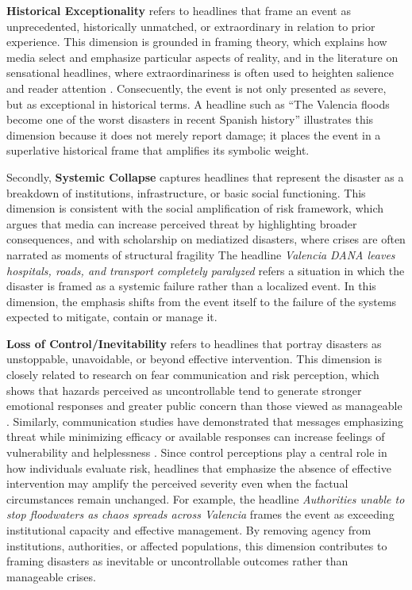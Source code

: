 \textbf{Historical Exceptionality} refers to headlines that frame an event as unprecedented, historically unmatched, or extraordinary in relation to prior experience. This dimension is grounded in framing theory,
which explains how media select and emphasize particular aspects of reality, and in the literature on sensational headlines, where extraordinariness is often used to heighten 
salience and reader attention \parencite{Entman1993,amplification_risk,pragma_linguistic}. Consecuently, the event is not only presented as severe, but as exceptional in historical terms.
A headline such as “The Valencia floods become one of the worst disasters in recent Spanish history” illustrates this dimension because it does not merely report damage; it places the event in 
a superlative historical frame that amplifies its symbolic weight.

Secondly, \textbf{Systemic Collapse} captures headlines that represent the disaster as a breakdown of institutions, infrastructure, or basic social functioning. This dimension is consistent with the 
social amplification of risk framework, which argues that media can increase perceived threat by highlighting broader consequences,
and with scholarship on mediatized disasters, where crises are often narrated as moments of structural fragility \parencite{amplification_risk, DisastersandtheMedia, creating_fear}
The headline \emph{Valencia DANA leaves hospitals, roads, and transport completely paralyzed} refers a situation in which the disaster is framed as a systemic failure rather than a localized event.
In this dimension, the emphasis shifts from the event itself to the failure of the systems expected to mitigate, contain or manage it.

\textbf{Loss of Control/Inevitability} refers to headlines that portray disasters as unstoppable, unavoidable, or beyond effective intervention. 
This dimension is closely related to research on fear communication and risk perception, which shows that hazards perceived as uncontrollable 
tend to generate stronger emotional responses and greater public concern than those viewed as manageable \parencite{perception_risk}. 
Similarly, communication studies have demonstrated that messages emphasizing threat while minimizing efficacy or available responses can 
increase feelings of vulnerability and helplessness \parencite{Fear_appeal}. 
Since control perceptions play a central role in how individuals evaluate risk, headlines that emphasize the absence of effective intervention may amplify the 
perceived severity even when the factual circumstances remain unchanged. 
For example, the headline \emph{Authorities unable to stop floodwaters as chaos spreads across Valencia} frames the event as
exceeding institutional capacity and effective management. By removing agency from institutions, authorities, or affected populations,
this dimension contributes to framing disasters as inevitable or uncontrollable outcomes rather than manageable crises.

